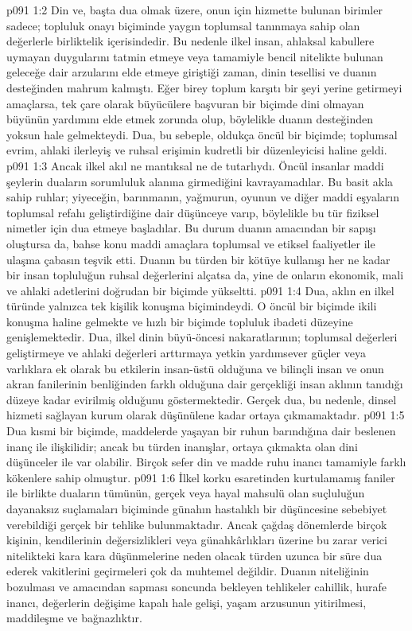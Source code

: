 \vs p091 1:2 Din ve, başta dua olmak üzere, onun için hizmette bulunan birimler sadece; topluluk onayı biçiminde yaygın toplumsal tanınmaya sahip olan değerlerle birliktelik içerisindedir. Bu nedenle ilkel insan, ahlaksal kabullere uymayan duygularını tatmin etmeye veya tamamiyle bencil nitelikte bulunan geleceğe dair arzularını elde etmeye giriştiği zaman, dinin tesellisi ve duanın desteğinden mahrum kalmıştı. Eğer birey toplum karşıtı bir şeyi yerine getirmeyi amaçlarsa, tek çare olarak büyücülere başvuran bir biçimde dini olmayan büyünün yardımını elde etmek zorunda olup, böylelikle duanın desteğinden yoksun hale gelmekteydi. Dua, bu sebeple, oldukça öncül bir biçimde; toplumsal evrim, ahlaki ilerleyiş ve ruhsal erişimin kudretli bir düzenleyicisi haline geldi.
\vs p091 1:3 Ancak ilkel akıl ne mantıksal ne de tutarlıydı. Öncül insanlar maddi şeylerin duaların sorumluluk alanına girmediğini kavrayamadılar. Bu basit akla sahip ruhlar; yiyeceğin, barınmanın, yağmurun, oyunun ve diğer maddi eşyaların toplumsal refahı geliştirdiğine dair düşünceye varıp, böylelikle bu tür fiziksel nimetler için dua etmeye başladılar. Bu durum duanın amacından bir sapışı oluştursa da, bahse konu maddi amaçlara toplumsal ve etiksel faaliyetler ile ulaşma çabasın teşvik etti. Duanın bu türden bir kötüye kullanışı her ne kadar bir insan topluluğun ruhsal değerlerini alçatsa da, yine de onların ekonomik, mali ve ahlaki adetlerini doğrudan bir biçimde yükseltti.
\vs p091 1:4 Dua, aklın en ilkel türünde yalnızca tek kişilik konuşma biçimindeydi. O öncül bir biçimde ikili konuşma haline gelmekte ve hızlı bir biçimde topluluk ibadeti düzeyine genişlemektedir. Dua, ilkel dinin büyü\hyp{}öncesi nakaratlarının; toplumsal değerleri geliştirmeye ve ahlaki değerleri arttırmaya yetkin yardımsever güçler veya varlıklara ek olarak bu etkilerin insan\hyp{}üstü olduğuna ve bilinçli insan ve onun akran fanilerinin benliğinden farklı olduğuna dair gerçekliği insan aklının tanıdığı düzeye kadar evirilmiş olduğunu göstermektedir. Gerçek dua, bu nedenle, dinsel hizmeti sağlayan kurum  olarak düşünülene kadar ortaya çıkmamaktadır.
\vs p091 1:5 Dua kısmi bir biçimde, maddelerde yaşayan bir ruhun barındığına dair beslenen inanç ile ilişkilidir; ancak bu türden inanışlar, ortaya çıkmakta olan dini düşünceler ile var olabilir. Birçok sefer din ve madde ruhu inancı tamamiyle farklı kökenlere sahip olmuştur.
\vs p091 1:6 İlkel korku esaretinden kurtulamamış faniler ile birlikte duaların tümünün, gerçek veya hayal mahsulü olan suçluluğun dayanaksız suçlamaları biçiminde günahın hastalıklı bir düşüncesine sebebiyet verebildiği gerçek bir tehlike bulunmaktadır. Ancak çağdaş dönemlerde birçok kişinin, kendilerinin değersizlikleri veya günahkârlıkları üzerine bu zarar verici nitelikteki kara kara düşünmelerine neden olacak türden uzunca bir süre dua ederek vakitlerini geçirmeleri çok da muhtemel değildir. Duanın niteliğinin bozulması ve amacından sapması soncunda bekleyen tehlikeler cahillik, hurafe inancı, değerlerin değişime kapalı hale gelişi, yaşam arzusunun yitirilmesi, maddileşme ve bağnazlıktır.
